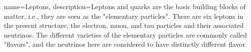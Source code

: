 {
    name=Leptons,
    description={Leptons and quarks are the basic building blocks of matter, i.e., they are seen as the "elementary particles". There are six leptons in the present structure, the electron, muon, and tau particles and their associated neutrinos. The different varieties of the elementary particles are commonly called "flavors", and the neutrinos here are considered to have distinctly different flavor.}
}
 
